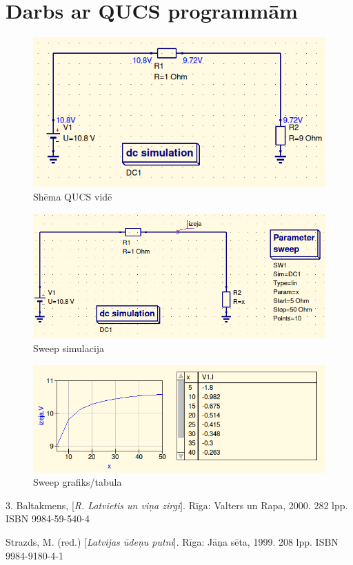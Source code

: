 \documentclass{report}
\begin{document}
\section{Darbs ar QUCS programmām}

    \begin{figure}[!htb]
    \centering
        \includegraphics[scale=0.5]{2}
        \caption{Shēma QUCS vidē}
    \end{figure}


    \begin{figure}[!htb]
    \centering
        \includegraphics[scale=0.5]{kq1}
        \caption{Sweep simulacija}
    \end{figure}
    
    \begin{figure}[!htb]
    \centering
        \includegraphics[scale=0.5]{kq2}
        \caption{Sweep grafiks/tabula}
    \end{figure}
\newpage
\renewcommand{\bibname}{Literatūras saraksts}
\begin{thebibliography}{9}
3. Baltakmens, [\textit{R. Latvietis un viņa zirgi}]. Rīga: Valters un Rapa, 2000. 282 lpp. ISBN 9984-59-540-4

 
Strazds, M. (red.) [\textit{Latvijas ūdeņu putni}]. Rīga: Jāņa sēta, 1999. 208 lpp. ISBN 9984-9180-4-1

 
\end{thebibliography}
\end{document}
